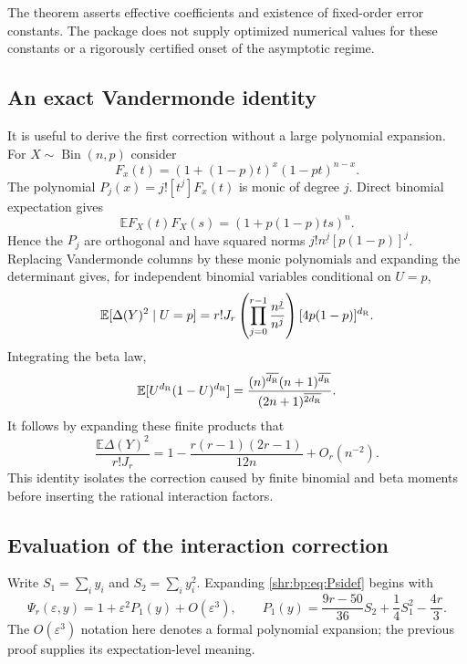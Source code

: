 \documentclass[11pt,letterpaper]{article}
\numberwithin{equation}{section}
\theoremstyle{definition}
\newcommand{\E}{\mathbb E}
\newcommand{\1}{\mathbf 1}
\newcommand{\fall}[2]{#1^{\underline{#2}}}
\newcommand{\eps}{\varepsilon}
\newcommand{\rise}[2]{(#1)^{\overline{#2}}}
\begin{document}
The theorem asserts effective coefficients and existence of fixed-order
error constants. The package does not supply optimized numerical values
for these constants or a rigorously certified onset of the asymptotic
regime.

\subsection{An exact Vandermonde identity}
It is useful to derive the first correction without a large polynomial
expansion. For $X\sim\operatorname{Bin}(n,p)$ consider
\begin{equation}
 F_x(t)=(1+(1-p)t)^x(1-pt)^{n-x}.
\end{equation}
The polynomial $P_j(x)=j![t^j]F_x(t)$ is monic of degree $j$. Direct
binomial expectation gives
\begin{equation}
 \E F_X(t)F_X(s)=(1+p(1-p)ts)^n.
\end{equation}
Hence the $P_j$ are orthogonal and have squared norms
$j!\fall{n}{j}[p(1-p)]^j$. Replacing Vandermonde columns by these monic
polynomials and expanding the determinant gives, for independent
binomial variables conditional on $U=p$,
\begin{equation}
 \E[\Delta(Y)^2\mid U=p]
 =r!J_r\left(\prod_{j=0}^{r-1}\frac{\fall nj}{n^j}\right)
 [4p(1-p)]^{d_{\rm R}}.
 \label{shr:bp:eq:binomialVdm}
\end{equation}
Integrating the beta law,
\begin{equation}
 \E[U^{d_{\rm R}}(1-U)^{d_{\rm R}}]=
 \frac{\rise n{d_{\rm R}}\rise{n+1}{d_{\rm R}}}{\rise{2n+1}{2d_{\rm R}}}.
 \label{shr:bp:eq:betad}
\end{equation}
It follows by expanding these finite products that
\begin{equation}
 \frac{\E\Delta(Y)^2}{r!J_r}
 =1-\frac{r(r-1)(2r-1)}{12n}+O_r(n^{-2}).
 \label{shr:bp:eq:vdm-correction}
\end{equation}
This identity isolates the correction caused by finite binomial and beta
moments before inserting the rational interaction factors.

\subsection{Evaluation of the interaction correction}
Write $S_1=\sum_i y_i$ and $S_2=\sum_i y_i^2$. Expanding
\eqref{shr:bp:eq:Psidef} begins with
\begin{equation}
 \Psi_r(\eps,y)=1+\eps^2P_1(y)+O(\eps^3),\qquad
 P_1(y)=\frac{9r-50}{36}S_2+\frac14S_1^2-\frac{4r}{3}.
 \label{shr:bp:eq:P1}
\end{equation}
The $O(\eps^3)$ notation here denotes a formal polynomial expansion;
the previous proof supplies its expectation-level meaning.
\end{document}
